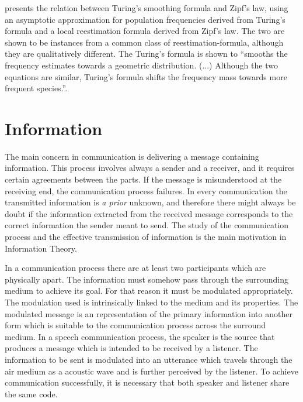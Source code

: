 \cite{samuelsson1996} presents the relation between Turing's smoothing formula
and Zipf's law, using an asymptotic approximation for population frequencies
derived from Turing's formula and a local reestimation formula derived from 
Zipf's law. The two are shown to be instances from a common class of reestimation-formula,
although they are qualitatively different. The Turing's formula is shown to ``smooths
the frequency estimates towards a geometric distribution. (...) Although the two equations  
are similar, Turing's formula shifts the frequency mass towards more frequent species.''. 











\section{Information}
The main concern in communication is delivering a message containing information.
This process involves always a sender and a receiver, and it requires certain agreements 
between the parts. If the message is misunderstood at the receiving end, the communication process failures.
In every communication the transmitted information is \textit{a prior} unknown, and therefore there might
always be doubt if the information extracted from the received message corresponds to the correct 
information the sender meant to send. The study of the communication process and the effective transmission
of information is the main motivation in Information Theory.

In a communication process there are at least two participants which are physically apart. 
The information must somehow pass through the surrounding medium to achieve its goal. For that reason
it must be modulated appropriately. The modulation used is intrinsically linked to the medium 
and its properties.
The modulated message is an representation of the primary information into another form which is
suitable to the communication process across the surround medium.
In a speech communication process, the speaker is the source that produces a message which is 
intended to be received by a listener. The information to be sent is modulated into an utterance
which travels through the air medium as a acoustic wave and is further perceived by the listener.
To achieve communication successfully, it is necessary that both speaker and listener share
the same code.

